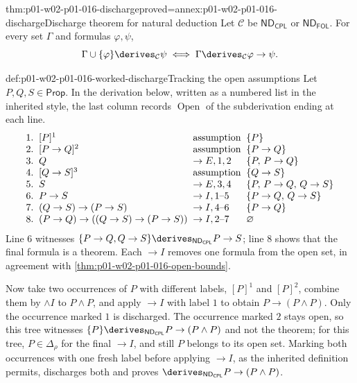 \begin{hbtheorem}{thm:p01-w02-p01-016-discharge}{proved=annex:p01-w02-p01-016-discharge}{Discharge theorem for natural deduction}
Let \(\mathcal C\) be \(\mathsf{ND}_{\mathsf{CPL}}\) or
\(\mathsf{ND}_{\mathsf{FOL}}\). For every set \(\Gamma\) and formulas
\(\varphi,\psi\),
\[
  \Gamma\cup\{\varphi\}\derives_{\mathcal C}\psi
  \iff
  \Gamma\derives_{\mathcal C}\varphi\to\psi .
\]
\end{hbtheorem}

\begin{hbexample}{def:p01-w02-p01-016-worked-discharge}{Tracking the open assumptions}
Let \(P,Q,S\in\mathsf{Prop}\). In the derivation below, written as a
numbered list in the inherited style, the last column records
\(\operatorname{Open}\) of the subderivation ending at each line.
\[
\begin{array}{@{}r@{\;\;}l@{\;\;}l@{\;\;}l@{}}
1.&[P]^1&\text{assumption}&\{P\}\\
2.&[P\to Q]^2&\text{assumption}&\{P\to Q\}\\
3.&Q&\to E,1,2&\{P,\,P\to Q\}\\
4.&[Q\to S]^3&\text{assumption}&\{Q\to S\}\\
5.&S&\to E,3,4&\{P,\,P\to Q,\,Q\to S\}\\
6.&P\to S&\to I,1\text{--}5&\{P\to Q,\,Q\to S\}\\
7.&(Q\to S)\to(P\to S)&\to I,4\text{--}6&\{P\to Q\}\\
8.&(P\to Q)\to((Q\to S)\to(P\to S))&\to I,2\text{--}7&\varnothing
\end{array}
\]
Line 6 witnesses \(\{P\to Q,Q\to S\}\derives_{\mathsf{ND}_{\mathsf{CPL}}}P\to S\);
line 8 shows that the final formula is a theorem. Each \(\to I\) removes one
formula from the open set, in agreement with
\cref{thm:p01-w02-p01-016-open-bounds}.

Now take two occurrences of \(P\) with different labels, \([P]^1\) and
\([P]^2\), combine them by \(\land I\) to \(P\land P\), and apply \(\to I\)
with label \(1\) to obtain \(P\to(P\land P)\). Only the occurrence marked
\(1\) is discharged. The occurrence marked \(2\) stays open, so this tree
witnesses \(\{P\}\derives_{\mathsf{ND}_{\mathsf{CPL}}}P\to(P\land P)\) and
not the theorem; for this tree, \(P\in\Delta_\rho\) for the final
\(\to I\), and still \(P\) belongs to its open set.
Marking both occurrences with one fresh label before applying \(\to I\), as
the inherited definition permits, discharges both and proves
\(\derives_{\mathsf{ND}_{\mathsf{CPL}}}P\to(P\land P)\).
\end{hbexample}

